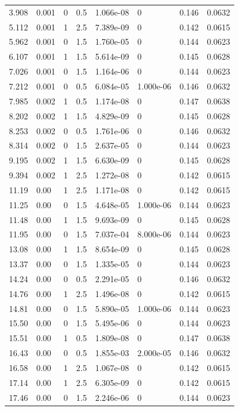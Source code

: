 \documentclass[preview]{standalone}
\begin{document}
{{\begin{tabular}{L{1.2cm}C{1.2cm} C{0.3cm}C{0.5cm} C{1.4cm}C{1.4cm} C{1.4cm}C{1.4cm}}
  3.908  &  0.001  & 0     & 0.5 &  1.066e-08  & 0  & 0.146 &  0.0632   \\ 
  5.112  &  0.001  & 1     & 2.5 &  7.389e-09  & 0  & 0.142 &  0.0615   \\ 
  5.962  &  0.001  & 0     & 1.5 &  1.760e-05  & 0  & 0.144 &  0.0623   \\ 
  6.107  &  0.001  & 1     & 1.5 &  5.614e-09  & 0  & 0.145 &  0.0628   \\ 
  7.026  &  0.001  & 0     & 1.5 &  1.164e-06  & 0  & 0.144 &  0.0623   \\ 
  7.212  &  0.001  & 0     & 0.5 &  6.084e-05  & 1.000e-06  & 0.146 &  0.0632   \\ 
  7.985  &  0.002  & 1     & 0.5 &  1.174e-08  & 0  & 0.147 &  0.0638   \\ 
  8.202  &  0.002  & 1     & 1.5 &  4.829e-09  & 0  & 0.145 &  0.0628   \\ 
  8.253  &  0.002  & 0     & 0.5 &  1.761e-06  & 0  & 0.146 &  0.0632   \\ 
  8.314  &  0.002  & 0     & 1.5 &  2.637e-05  & 0  & 0.144 &  0.0623   \\ 
  9.195  &  0.002  & 1     & 1.5 &  6.630e-09  & 0  & 0.145 &  0.0628   \\ 
  9.394  &  0.002  & 1     & 2.5 &  1.272e-08  & 0  & 0.142 &  0.0615   \\ 
  11.19  &  0.00  & 1     & 2.5 &  1.171e-08  & 0  & 0.142 &  0.0615   \\ 
  11.25  &  0.00  & 0     & 1.5 &  4.648e-05  & 1.000e-06  & 0.144 &  0.0623   \\ 
  11.48  &  0.00  & 1     & 1.5 &  9.693e-09  & 0  & 0.145 &  0.0628   \\ 
  11.95  &  0.00  & 0     & 1.5 &  7.037e-04  & 8.000e-06  & 0.144 &  0.0623   \\ 
  13.08  &  0.00  & 1     & 1.5 &  8.654e-09  & 0  & 0.145 &  0.0628   \\ 
  13.37  &  0.00  & 0     & 1.5 &  1.335e-05  & 0  & 0.144 &  0.0623   \\ 
  14.24  &  0.00  & 0     & 0.5 &  2.291e-05  & 0  & 0.146 &  0.0632   \\ 
  14.76  &  0.00  & 1     & 2.5 &  1.496e-08  & 0  & 0.142 &  0.0615   \\ 
  14.81  &  0.00  & 0     & 1.5 &  5.890e-05  & 1.000e-06  & 0.144 &  0.0623   \\ 
  15.50  &  0.00  & 0     & 1.5 &  5.495e-06  & 0  & 0.144 &  0.0623   \\ 
  15.51  &  0.00  & 1     & 0.5 &  1.809e-08  & 0  & 0.147 &  0.0638   \\ 
  16.43  &  0.00  & 0     & 0.5 &  1.855e-03  & 2.000e-05  & 0.146 &  0.0632   \\ 
  16.58  &  0.00  & 1     & 2.5 &  1.067e-08  & 0  & 0.142 &  0.0615   \\ 
  17.14  &  0.00  & 1     & 2.5 &  6.305e-09  & 0  & 0.142 &  0.0615   \\ 
  17.46  &  0.00  & 0     & 1.5 &  2.246e-06  & 0  & 0.144 &  0.0623   \\ 
\hline 
\end{tabular} 

}}
\end{document}
